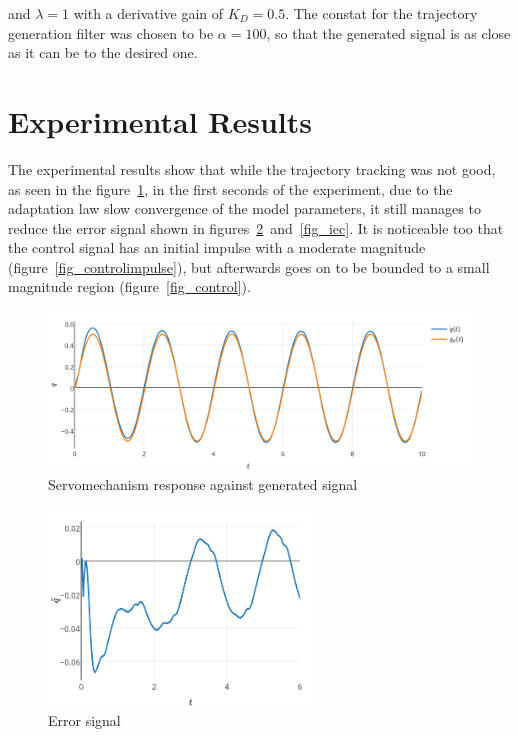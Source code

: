 \documentclass[journal]{IEEEtran}
\begin{document}
    and $\lambda = 1$ with a derivative gain of $K_D = 0.5$. The constat for the trajectory generation filter was chosen to be $\alpha = 100$, so that the generated signal is as close as it can be to the desired one.

\section{Experimental Results}
    The experimental results show that while the trajectory tracking was not good, as seen in the figure~\ref{fig_respuesta}, in the first seconds of the experiment, due to the adaptation law slow convergence of the model parameters, it still manages to reduce the error signal shown in figures~\ref{fig_error}~and~\ref{fig_iec}. It is noticeable too that the control signal has an initial impulse with a moderate magnitude (figure~\ref{fig_controlimpulse}), but afterwards goes on to be bounded to a small magnitude region (figure~\ref{fig_control}).

    \begin{figure}[!t]
        \centering
        \includegraphics[width=\textwidth]{respuestatrayectoria}
        \caption{Servomechanism response against generated signal}
        \label{fig_respuesta}
    \end{figure}

    \begin{figure}[!t]
        \centering
        \includegraphics[width=7cm]{error}
        \caption{Error signal}
        \label{fig_error}
    \end{figure}
\end{document}
